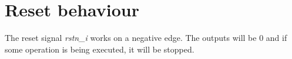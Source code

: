 \section{Reset behaviour}

The reset signal \textit{rstn\_i} works on a negative edge.
The outputs will be 0 and if some operation is being executed, it will be stopped.
